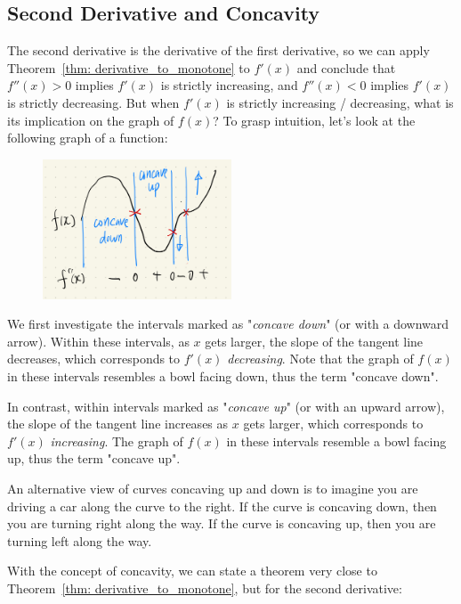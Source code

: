 \subsection{Second Derivative and Concavity}
The second derivative is the derivative of the first derivative, so we can apply Theorem~\ref{thm: derivative_to_monotone} to $f'(x)$ and conclude that $f''(x) > 0$ implies $f'(x)$ is strictly increasing, and $f''(x) < 0$ implies $f'(x)$ is strictly decreasing.  But when $f'(x)$ is strictly increasing / decreasing, what is its implication on the graph of $f(x)$?  To grasp intuition, let's look at the following graph of a function:

\begin{figure}[ht]
    \centering
    \includegraphics[width = 0.5\textwidth]{figures/chap 05/concavity.png}
    \label{fig: concavity}
\end{figure}

We first investigate the intervals marked as "\textit{concave down}" (or with a downward arrow).  Within these intervals, as $x$ gets larger, the slope of the tangent line decreases, which corresponds to $f'(x)$ \textit{decreasing}.  Note that the graph of $f(x)$ in these intervals resembles a bowl facing down, thus the term "concave down".  

In contrast, within intervals marked as "\textit{concave up}" (or with an upward arrow), the slope of the tangent line increases as $x$ gets larger, which corresponds to $f'(x)$ \textit{increasing}.  The graph of $f(x)$ in these intervals resemble a bowl facing up, thus the term "concave up".

An alternative view of curves concaving up and down is to imagine you are driving a car along the curve to the right.  If the curve is concaving down, then you are turning right along the way.  If the curve is concaving up, then you are turning left along the way.

With the concept of concavity, we can state a theorem very close to Theorem~\ref{thm: derivative_to_monotone}, but for the second derivative:

